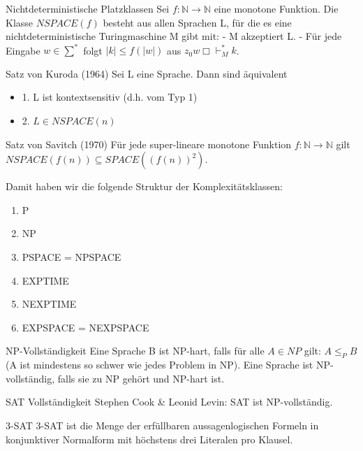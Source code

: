 \documentclass[avery5371]{flashcards}
\begin{document}
\begin{flashcard}[Definition]{Nichtdeterministische Platzklassen} Sei $f:\mathbb{N}\rightarrow\mathbb{N}$ eine monotone Funktion. Die Klasse $NSPACE(f)$ besteht aus allen Sprachen L, für die es eine nichtdeterministische Turingmaschine M gibt mit:
- M akzeptiert L.
- Für jede Eingabe $w\in\sum^*$ folgt $|k| \leq f(|w|)$ aus $z_0 w\Box\vdash_M^* k$.
\end{flashcard}

\begin{flashcard}[Satz]{ Satz  von Kuroda (1964)}
Sei L eine Sprache. Dann sind äquivalent
\begin{itemize}
\item 1. L ist kontextsensitiv (d.h. vom Typ 1)
\item 2. $L\in NSPACE(n)$
    \end{itemize}
\end{flashcard}

\begin{flashcard}[Satz]{ Satz  von Savitch (1970)}
Für jede super-lineare monotone Funktion $f:\mathbb{N}\rightarrow\mathbb{N}$ gilt $NSPACE (f(n))\subseteq SPACE((f(n))^2)$.

Damit haben wir die folgende Struktur der Komplexitätsklassen:\begin{enumerate}
\item P
\item NP
\item PSPACE = NPSPACE
\item EXPTIME
\item NEXPTIME
\item EXPSPACE = NEXPSPACE
\end{enumerate}
\end{flashcard}

\begin{flashcard}[Definition]{NP-Vollständigkeit} 
Eine Sprache B ist NP-hart, falls für alle $A\in NP$ gilt: $A \leq_P B$ (A ist mindestens so schwer wie jedes Problem in NP). Eine Sprache ist NP-vollständig, falls sie zu NP gehört und NP-hart ist.
\end{flashcard}

\begin{flashcard}[Satz]{SAT Vollständigkeit} 
Stephen Cook \& Leonid Levin: SAT ist NP-vollständig.
\end{flashcard}

\begin{flashcard}[Definition]{3-SAT}
3-SAT ist die Menge der erfüllbaren aussagenlogischen Formeln in konjunktiver Normalform mit höchstens drei Literalen pro Klausel.
\end{flashcard}
\end{document}
